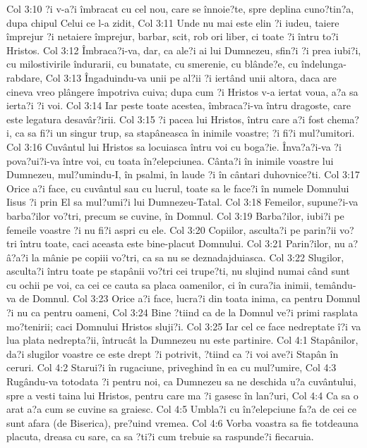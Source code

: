 Col 3:10  ?i v-a?i îmbracat cu cel nou, care se înnoie?te, spre deplina cuno?tin?a, dupa chipul Celui ce l-a zidit,
Col 3:11  Unde nu mai este elin ?i iudeu, taiere împrejur ?i netaiere împrejur, barbar, scit, rob ori liber, ci toate ?i întru to?i Hristos.
Col 3:12  Îmbraca?i-va, dar, ca ale?i ai lui Dumnezeu, sfin?i ?i prea iubi?i, cu milostivirile îndurarii, cu bunatate, cu smerenie, cu blânde?e, cu îndelunga-rabdare,
Col 3:13  Îngaduindu-va unii pe al?ii ?i iertând unii altora, daca are cineva vreo plângere împotriva cuiva; dupa cum ?i Hristos v-a iertat voua, a?a sa ierta?i ?i voi.
Col 3:14  Iar peste toate acestea, îmbraca?i-va întru dragoste, care este legatura desavâr?irii.
Col 3:15  ?i pacea lui Hristos, întru care a?i fost chema?i, ca sa fi?i un singur trup, sa stapâneasca în inimile voastre; ?i fi?i mul?umitori.
Col 3:16  Cuvântul lui Hristos sa locuiasca întru voi cu boga?ie. Înva?a?i-va ?i pova?ui?i-va între voi, cu toata în?elepciunea. Cânta?i în inimile voastre lui Dumnezeu, mul?umindu-I, în psalmi, în laude ?i în cântari duhovnice?ti.
Col 3:17  Orice a?i face, cu cuvântul sau cu lucrul, toate sa le face?i în numele Domnului Iisus ?i prin El sa mul?umi?i lui Dumnezeu-Tatal.
Col 3:18  Femeilor, supune?i-va barba?ilor vo?tri, precum se cuvine, în Domnul.
Col 3:19  Barba?ilor, iubi?i pe femeile voastre ?i nu fi?i aspri cu ele.
Col 3:20  Copiilor, asculta?i pe parin?ii vo?tri întru toate, caci aceasta este bine-placut Domnului.
Col 3:21  Parin?ilor, nu a?â?a?i la mânie pe copiii vo?tri, ca sa nu se deznadajduiasca.
Col 3:22  Slugilor, asculta?i întru toate pe stapânii vo?tri cei trupe?ti, nu slujind numai când sunt cu ochii pe voi, ca cei ce cauta sa placa oamenilor, ci în cura?ia inimii, temându-va de Domnul.
Col 3:23  Orice a?i face, lucra?i din toata inima, ca pentru Domnul ?i nu ca pentru oameni,
Col 3:24  Bine ?tiind ca de la Domnul ve?i primi rasplata mo?tenirii; caci Domnului Hristos sluji?i.
Col 3:25  Iar cel ce face nedreptate î?i va lua plata nedrepta?ii, întrucât la Dumnezeu nu este partinire.
Col 4:1  Stapânilor, da?i slugilor voastre ce este drept ?i potrivit, ?tiind ca ?i voi ave?i Stapân în ceruri.
Col 4:2  Starui?i în rugaciune, priveghind în ea cu mul?umire,
Col 4:3  Rugându-va totodata ?i pentru noi, ca Dumnezeu sa ne deschida u?a cuvântului, spre a vesti taina lui Hristos, pentru care ma ?i gasesc în lan?uri,
Col 4:4  Ca sa o arat a?a cum se cuvine sa graiesc.
Col 4:5  Umbla?i cu în?elepciune fa?a de cei ce sunt afara (de Biserica), pre?uind vremea.
Col 4:6  Vorba voastra sa fie totdeauna placuta, dreasa cu sare, ca sa ?ti?i cum trebuie sa raspunde?i fiecaruia.
